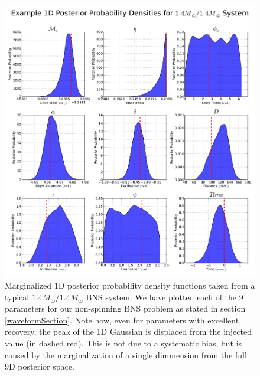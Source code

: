 \documentclass{emulateapj}
\begin{document}
\begin{figure}[h]
\begin{center}
\includegraphics[trim=0cm 0cm 0cm 0cm, clip=true,scale=0.57]{9dpdf.pdf}
\end{center}
\caption{Marginalized 1D posterior probability density functions taken from a typical $1.4M_{\odot}/1.4M_{\odot}$ BNS system.  We have plotted each of the 9 parameters for our non-spinning BNS problem as stated in section \ref{waveformSection}.  Note how, even for parameters with excellent recovery, the peak of the 1D Gaussian is displaced from the injected value (in dashed red).  This is not due to a systematic bias, but is caused by the marginalization of a single dimmension from the full 9D posterior space.}
\end{figure}
\end{document}
